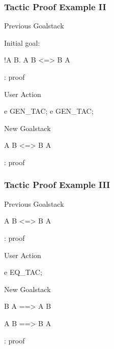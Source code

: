 \begin{frame}[fragile]
\frametitle{Tactic Proof Example II}

\begin{block}{Previous Goalstack}
\begin{semiverbatim}
Initial goal:

!A B. A \holAnd{} B <=> B \holAnd{} A

: proof
\end{semiverbatim}
\end{block}

\begin{block}{User Action}
\begin{semiverbatim}
e GEN_TAC;
e GEN_TAC;
\end{semiverbatim}
\end{block}

\begin{block}{New Goalstack}
\begin{semiverbatim}
A \holAnd{} B <=> B \holAnd{} A

: proof
\end{semiverbatim}
\end{block}
\end{frame}


\begin{frame}[fragile]
\frametitle{Tactic Proof Example III}

\begin{block}{Previous Goalstack}
\begin{semiverbatim}
A \holAnd{} B <=> B \holAnd{} A

: proof
\end{semiverbatim}
\end{block}

\begin{block}{User Action}
\begin{semiverbatim}
e EQ_TAC;
\end{semiverbatim}
\end{block}

\begin{block}{New Goalstack}
\begin{semiverbatim}
B \holAnd{} A ==> A \holAnd{} B

A \holAnd{} B ==> B \holAnd{} A 

: proof
\end{semiverbatim}
\end{block}
\end{frame}


